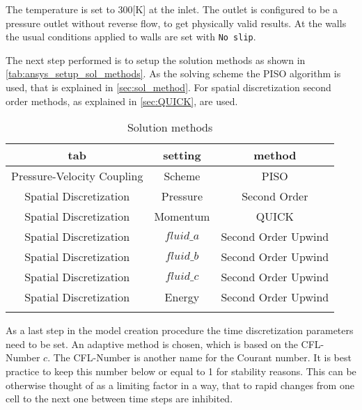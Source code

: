 \documentclass[../thesis.tex]{subfiles}
\begin{document}
The temperature is set to 300[K] at the inlet. The outlet is configured to be a pressure outlet without reverse flow, to get physically valid results. At the walls the usual conditions applied to walls are set with \texttt{No slip}.

The next step performed is to setup the solution methods as shown in \autoref{tab:ansys_setup_sol_methods}. As the solving scheme the PISO algorithm is used, that is explained in \autoref{sec:sol_method}. For spatial discretization second order methods, as explained in \autoref{sec:QUICK}, are used. 
\begin{table} [htb]
	\centering
	\caption{Solution methods}
	\begin{tabular}{ ccc }
		\hline
		tab & setting & method \\
		\hline
		Pressure-Velocity Coupling & Scheme & PISO \\
		Spatial Discretization & Pressure & Second Order \\
		Spatial Discretization & Momentum & QUICK \\
		Spatial Discretization & $fluid\_a$ & Second Order Upwind \\
		Spatial Discretization & $fluid\_b$ & Second Order Upwind \\
		Spatial Discretization & $fluid\_c$ & Second Order Upwind \\
		Spatial Discretization & Energy & Second Order Upwind \\
		\hline		
		\label{tab:ansys_setup_sol_methods}
	\end{tabular}
\end{table}

As a last step in the model creation procedure the time discretization parameters need to be set. An adaptive method is chosen, which is based on the CFL-Number $c$. The CFL-Number is another name for the Courant number. It is best practice to keep this number below or equal to 1 for stability reasons. This can be otherwise thought of as a limiting factor in a way, that to rapid changes from one cell to the next one between time steps are inhibited.
  
\end{document}
